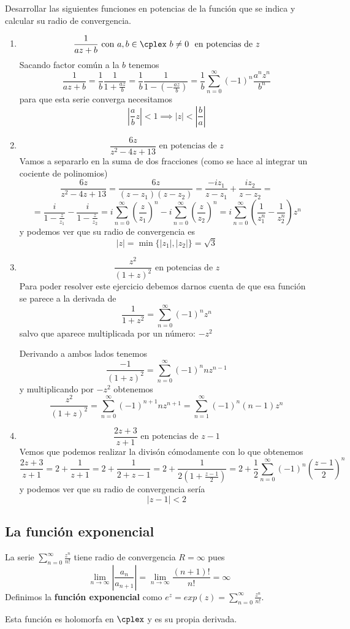 \documentclass{apuntes}
\begin{document}
\begin{example}
Desarrollar las siguientes funciones en potencias de la función que se indica y calcular su radio de convergencia.
\begin{enumerate}
\item
\[\frac{1}{az+b} \text{ con } a,b \in \cplex \ b \neq 0 \ \text{ en potencias de } z\]
Sacando factor común a la $b$ tenemos
\[\frac{1}{az+b} =  \frac{1}{b} \frac{1}{1+\frac{az}{b}} = \frac{1}{b}\frac{1}{1-\left(-\frac{az}{b}\right)} = \frac{1}{b}\sum_{n=0}^{\infty}(-1)^n\frac{a^nz^n}{b^n}\]
para que esta serie converga necesitamos
\[\left| \frac{a}{b}z\right| < 1 \implies |z| < \left| \frac{b}{a} \right|\]

\item
\[\frac{6z}{z^2-4z+13} \text{ en potencias de } z\]
Vamos a separarlo en la suma de dos fracciones (como se hace al integrar un cociente de polinomios)
\[\frac{6z}{z^2-4z+13} = \frac{6z}{(z-z_1)(z-z_2)} = \frac{-iz_1}{z-z_1} + \frac{iz_2}{z-z_2} = \]
\[= \frac{i}{1-\frac{z}{z_1}} - \frac{i}{1-\frac{z}{z_2}} = i\sum_{n=0}^{\infty}\left(\frac{z}{z_1}\right)^n - i\sum_{n=0}^{\infty}\left(\frac{z}{z_2}\right)^n = i\sum_{n=0}^{\infty}\left( \frac{1}{z_1^n}-\frac{1}{z_2^n}\right)z^n\]
y podemos ver que su radio de convergencia es
\[|z| = \min \{|z_1|, |z_2|\}= \sqrt{3}\]

\item
\[\frac{z^2}{(1+z)^2} \text{ en potencias de } z\]
Para poder resolver este ejercicio debemos darnos cuenta de que esa función se parece a la derivada de
\[\frac{1}{1+z^2} = \sum_{n=0}^{\infty}(-1)^n z^n\]
salvo que aparece multiplicada por un número: $-z^2$

Derivando a ambos lados tenemos
\[\frac{-1}{(1+z)^2}=\sum_{n=0}^{\infty}(-1)^nnz^{n-1}\]
y multiplicando por $-z^2$ obtenemos
\[\frac{z^2}{(1+z)^2} = \sum_{n=0}^{\infty}(-1)^{n+1}nz^{n+1} = \sum_{n=1}^{\infty}(-1)^n(n-1)z^{n}\]

\item
\[\frac{2z+3}{z+1} \text{ en potencias de } z-1\]
Vemos que podemos realizar la divisón cómodamente con lo que obtenemos
\[\frac{2z+3}{z+1}=2+\frac{1}{z+1} = 2 + \frac{1}{2+z-1} = 2 + \frac{1}{2\left( 1+\frac{z-1}{2}\right)} = 2+\frac{1}{2}\sum_{n=0}^{\infty}(-1)^n\left(\frac{z-1}{2} \right)^n\]
y podemos ver que su radio de convergencia sería
\[|z-1| < 2\]

\end{enumerate}
\end{example}

\subsection{La función exponencial}
\begin{defn}
La serie $\sum_{n=0}^{\infty}\frac{z^n}{n!}$ tiene radio de convergencia $R=\infty$ pues
\[\lim_{n \to \infty}\left| \frac{a_n}{a_{n+1}}\right| = \lim_{n \to \infty} \frac{(n+1)!}{n!} = \infty\]
Definimos la \textbf{función exponencial} como $e^z=exp(z)=\sum_{n=0}^{\infty}\frac{z^n}{n!}$.

Esta función es holomorfa en $\cplex$ y es su propia derivada.
\end{defn}
\end{document}
